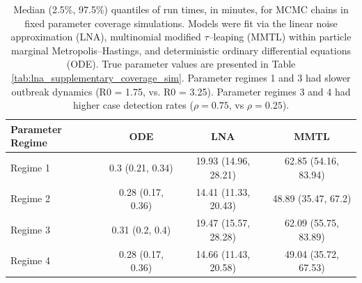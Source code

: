 \begin{table}[htbp]
	\centering
	\begin{tabular}{lccc}
		\hline
		\textbf{Parameter Regime} & \textbf{ODE} & \textbf{LNA} & \textbf{MMTL}\\ 
		\hline
		Regime 1& 0.3 (0.21, 0.34) & 19.93 (14.96, 28.21) & 62.85 (54.16, 83.94) \\ 
		Regime 2& 0.28 (0.17, 0.36) & 14.41 (11.33, 20.43) & 48.89 (35.47, 67.2) \\ 
		Regime 3& 0.31 (0.2, 0.4) & 19.47 (15.57, 28.28) & 62.09 (55.75, 83.89) \\ 
		Regime 4& 0.28 (0.17, 0.36) & 14.66 (11.43, 20.58) & 49.04 (35.72, 67.53) \\ 
		\hline
	\end{tabular}
	\caption[Run times for fixed parameter coverage simulations.]{Median (2.5\%, 97.5\%) quantiles of run times, in minutes, for MCMC chains in fixed parameter coverage simulations. Models were fit via the linear noise approximation (LNA), multinomial modified $ \tau $--leaping (MMTL) within particle marginal Metropolis--Hastings, and deterministic ordinary differential equations (ODE). True parameter values are presented in Table \ref{tab:lna_supplementary_coverage_sim}. Parameter regimes 1 and 3 had slower outbreak dynamics (R0 = 1.75, vs. R0 = 3.25). Parameter regimes 3 and 4 had higher case detection rates ($ \rho = 0.75 $, vs $ \rho = 0.25 $).}
\end{table}

